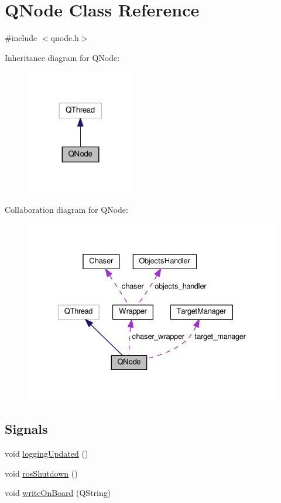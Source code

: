 \hypertarget{class_q_node}{}\section{Q\+Node Class Reference}
\label{class_q_node}


{\ttfamily \#include $<$qnode.\+h$>$}



Inheritance diagram for Q\+Node\+:
\nopagebreak
\begin{figure}[H]
\begin{center}
\leavevmode
\includegraphics[width=134pt]{class_q_node__inherit__graph}
\end{center}
\end{figure}


Collaboration diagram for Q\+Node\+:
\nopagebreak
\begin{figure}[H]
\begin{center}
\leavevmode
\includegraphics[width=329pt]{class_q_node__coll__graph}
\end{center}
\end{figure}
\subsection*{Signals}
\begin{DoxyCompactItemize}
\item 
void \hyperlink{class_q_node_abddcd4e0187f6d4513bbee7ba4656827}{logging\+Updated} ()
\item 
void \hyperlink{class_q_node_a7888b171c93c5f47334f5d2815adf445}{ros\+Shutdown} ()
\item 
void \hyperlink{class_q_node_a80d139522a1333db2c6ea33914c32378}{write\+On\+Board} (Q\+String)
\end{DoxyCompactItemize}
